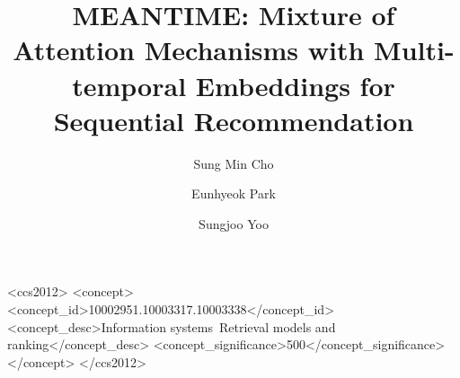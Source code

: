 \documentclass[manuscript]{acmart}
\begin{document}
\title[MEANTIME]{MEANTIME: Mixture of Attention Mechanisms with Multi-temporal Embeddings for Sequential Recommendation}



\author{Sung Min Cho}


\author{Eunhyeok Park}

\author{Sungjoo Yoo}

\renewcommand{\shortauthors}{Sung Min Cho, Eunhyeok Park, and Sungjoo Yoo}

\begin{abstract}

\end{abstract}

\begin{CCSXML}
<ccs2012>
   <concept>
       <concept_id>10002951.10003317.10003338</concept_id>
       <concept_desc>Information systems~Retrieval models and ranking</concept_desc>
       <concept_significance>500</concept_significance>
       </concept>
 </ccs2012>
\end{CCSXML}
\end{document}
